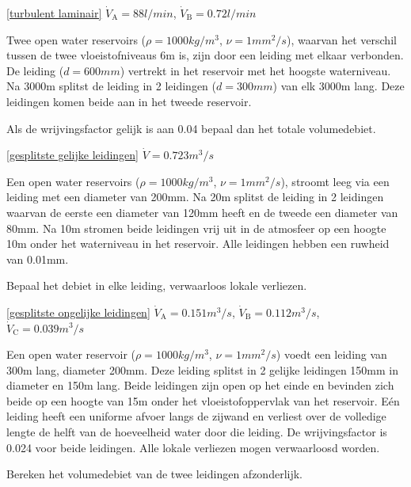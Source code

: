 \begin{antwoord}{\ref{turbulent laminair}}
	$\dot{V}_\mathrm{A} = 88\unit{l/min}$, $\dot{V}_\mathrm{B} = 0.72\unit{l/min}$
\end{antwoord}
\begin{toepassing}
	\label{gesplitste gelijke leidingen}
Twee open water reservoirs ($\rho=1000\unit{kg/m^3}$, $\nu=1\unit{mm^2/s}$), waarvan het verschil tussen de twee vloeistofniveaus 6\unit{m} is, zijn door een leiding met elkaar verbonden. De leiding ($d=600\unit{mm}$) vertrekt in het reservoir met het hoogste waterniveau. Na 3000\unit{m} splitst de leiding in 2 leidingen ($d=300\unit{mm}$) van elk 3000\unit{m} lang. Deze leidingen komen beide aan in het tweede reservoir. 
		
Als de wrijvingsfactor gelijk is aan 0.04 bepaal dan het totale volumedebiet. 
\end{toepassing}
\begin{antwoord}{\ref{gesplitste gelijke leidingen}}
	$\dot{V} = 0.723\unit{m^3/s}$
\end{antwoord}
\begin{toepassing}[*]
	\label{gesplitste ongelijke leidingen}
Een open water reservoirs ($\rho=1000\unit{kg/m^3}$, $\nu=1\unit{mm^2/s}$), stroomt leeg via een leiding met een diameter van 200\unit{mm}. Na 20\unit{m} splitst de leiding in 2 leidingen waarvan de eerste een diameter van 120\unit{mm} heeft en de tweede een diameter van 80\unit{mm}. Na 10\unit{m} stromen beide leidingen vrij uit in de atmosfeer op een hoogte 10\unit{m} onder het waterniveau in het reservoir. Alle leidingen hebben een ruwheid van 0.01\unit{mm}.

Bepaal het debiet in elke leiding, verwaarloos lokale verliezen.
\end{toepassing}
\begin{antwoord}{\ref{gesplitste ongelijke leidingen}}
	$\dot{V}_\mathrm{A} = 0.151\unit{m^3/s}$, $\dot{V}_\mathrm{B} = 0.112\unit{m^3/s}$,\\
	$\dot{V}_\mathrm{C} = 0.039\unit{m^3/s}$
\end{antwoord}
\begin{toepassing}[*]
	\label{geperforeerde leiding debiet}
Een open water reservoir ($\rho=1000\unit{kg/m^3}$, $\nu=1\unit{mm^2/s}$) voedt een leiding van 300\unit{m} lang, diameter 200\unit{mm}. Deze leiding splitst in 2 gelijke leidingen 150\unit{mm} in diameter en 150\unit{m} lang. Beide leidingen zijn open op het einde en bevinden zich beide op een hoogte van 15\unit{m} onder het vloeistofoppervlak van het reservoir. Eén leiding heeft een uniforme afvoer langs de zijwand en verliest over de volledige lengte de helft van de hoeveelheid water door die leiding. De wrijvingsfactor is 0.024 voor beide leidingen. Alle lokale verliezen mogen verwaarloosd worden.
		
Bereken het volumedebiet van de twee leidingen afzonderlijk. 
\end{toepassing}

